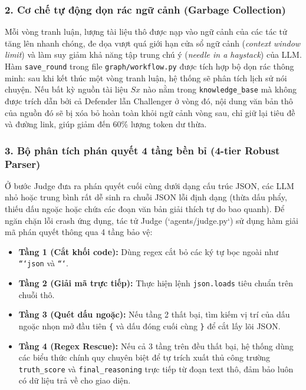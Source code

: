 \documentclass[12pt,a4paper]{report}
\begin{document}
\subsubsection{2. Cơ chế tự động dọn rác ngữ cảnh (Garbage Collection)}
Mỗi vòng tranh luận, lượng tài liệu thô được nạp vào ngữ cảnh của các tác tử tăng lên nhanh chóng, đe dọa vượt quá giới hạn cửa sổ ngữ cảnh (\textit{context window limit}) và làm suy giảm khả năng tập trung chú ý (\textit{needle in a haystack}) của LLM. Hàm \texttt{save\_round} trong file \texttt{graph/workflow.py} được tích hợp bộ dọn rác thông minh: sau khi kết thúc một vòng tranh luận, hệ thống sẽ phân tích lịch sử nói chuyện. Nếu bất kỳ nguồn tài liệu $Sx$ nào nằm trong \texttt{knowledge\_base} mà không được trích dẫn bởi cả Defender lẫn Challenger ở vòng đó, nội dung văn bản thô của nguồn đó sẽ bị xóa bỏ hoàn toàn khỏi ngữ cảnh vòng sau, chỉ giữ lại tiêu đề và đường link, giúp giảm đến 60\% lượng token dư thừa.

\subsubsection{3. Bộ phân tích phán quyết 4 tầng bền bỉ (4-tier Robust Parser)}
Ở bước Judge đưa ra phán quyết cuối cùng dưới dạng cấu trúc JSON, các LLM nhỏ hoặc trung bình rất dễ sinh ra chuỗi JSON lỗi định dạng (thừa dấu phẩy, thiếu dấu ngoặc hoặc chứa các đoạn văn bản giải thích tự do bao quanh). Để ngăn chặn lỗi crash ứng dụng, tác tử Judge (`agents/judge.py`) sử dụng hàm giải mã phán quyết thông qua 4 tầng bảo vệ:
\begin{itemize}
    \item \textbf{Tầng 1 (Cắt khối code):} Dùng regex cắt bỏ các ký tự bọc ngoài như \texttt{```json} và \texttt{```}.
    \item \textbf{Tầng 2 (Giải mã trực tiếp):} Thực hiện lệnh \texttt{json.loads} tiêu chuẩn trên chuỗi thô.
    \item \textbf{Tầng 3 (Quét dấu ngoặc):} Nếu tầng 2 thất bại, tìm kiếm vị trí của dấu ngoặc nhọn mở đầu tiên \texttt{\{} và dấu đóng cuối cùng \texttt{\}} để cắt lấy lõi JSON.
    \item \textbf{Tầng 4 (Regex Rescue):} Nếu cả 3 tầng trên đều thất bại, hệ thống dùng các biểu thức chính quy chuyên biệt để tự trích xuất thủ công trường \texttt{truth\_score} và \texttt{final\_reasoning} trực tiếp từ đoạn text thô, đảm bảo luôn có dữ liệu trả về cho giao diện.
\end{itemize}

\end{document}
